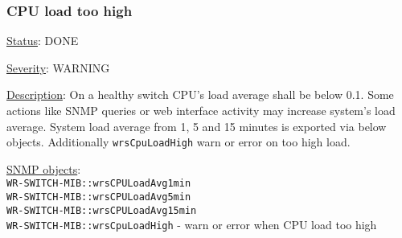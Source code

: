 \subsubsection{\bf CPU load too high}
		\label{fail:other:cpu}
		\begin{packed_enum}
			\item [] \underline{Status}: DONE
			\item [] \underline{Severity}: WARNING
			\item [] \underline{Description}:
				On a healthy switch CPU's load average shall be below 0.1. Some actions like
				SNMP queries or web interface activity may increase system's load average.
				System load average from 1, 5 and 15 minutes is exported via below objects.
				Additionally \texttt{wrsCpuLoadHigh} warn or error on too high load.
			\item [] \underline{SNMP objects}:\\
				\texttt{WR-SWITCH-MIB::wrsCPULoadAvg1min}\\
				\texttt{WR-SWITCH-MIB::wrsCPULoadAvg5min}\\
				\texttt{WR-SWITCH-MIB::wrsCPULoadAvg15min}\\
				\texttt{WR-SWITCH-MIB::wrsCpuLoadHigh} - warn or error when CPU load too high
		\end{packed_enum}

